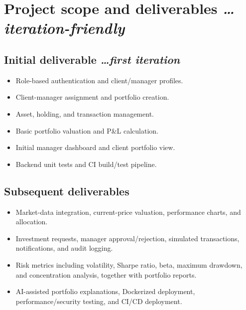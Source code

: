 \documentclass[11pt,a4paper]{article}
\newcommand{\BvrHint}[1]{{\normalfont\normalsize\itshape\hfill #1}}
\begin{document}
\section{Project scope and deliverables \BvrHint{\ldots iteration-friendly}}
\subsection{Initial deliverable \BvrHint{\ldots first iteration}}
\begin{itemize}[leftmargin=0.7cm]
\item Role-based authentication and client/manager profiles.
\item Client-manager assignment and portfolio creation.
\item Asset, holding, and transaction management.
\item Basic portfolio valuation and P\&L calculation.
\item Initial manager dashboard and client portfolio view.
\item Backend unit tests and CI build/test pipeline.
\end{itemize}

\subsection{Subsequent deliverables}
\begin{itemize}[leftmargin=0.7cm]
\item Market-data integration, current-price valuation, performance charts, and allocation.
\item Investment requests, manager approval/rejection, simulated transactions, notifications, and audit logging.
\item Risk metrics including volatility, Sharpe ratio, beta, maximum drawdown, and concentration analysis, together with portfolio reports.
\item AI-assisted portfolio explanations, Dockerized deployment, performance/security testing, and CI/CD deployment.
\end{itemize}
\end{document}
